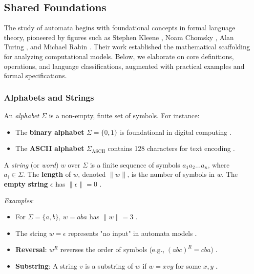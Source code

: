 
\subsection{Shared Foundations}
\label{subsec:shared-foundations} 

The study of automata begins with foundational concepts in formal language theory, pioneered by figures such as Stephen Kleene \cite{kleene1956representation}, Noam Chomsky \cite{chomsky1956three}, Alan Turing \cite{hopcroft2006introduction}, and Michael Rabin \cite{rabin1963probabilistic}. Their work established the mathematical scaffolding for analyzing computational models. Below, we elaborate on core definitions, operations, and language classifications, augmented with practical examples and formal specifications.

\subsubsection{Alphabets and Strings}
An \textit{alphabet} $\Sigma$ is a non-empty, finite set of symbols. For instance:
\begin{itemize}
    \item The \textbf{binary alphabet} $\Sigma = \{0, 1\}$ is foundational in digital computing \cite{hopcroft2006introduction}.
    \item The \textbf{ASCII alphabet} $\Sigma_{\text{ASCII}}$ contains 128 characters for text encoding \cite{cady1986ascii}.
\end{itemize}

A \textit{string} (or \textit{word}) $w$ over $\Sigma$ is a finite sequence of symbols $a_1a_2\ldots a_n$, where $a_i \in \Sigma$. The \textbf{length} of $w$, denoted $\|w\|$, is the number of symbols in $w$. The \textbf{empty string} $\epsilon$ has $\|\epsilon\| = 0$ \cite{hopcroft2006introduction}.  
\newline

\noindent\textit{Examples}:  
\begin{itemize}
    \item For $\Sigma = \{a, b\}$, $w = aba$ has $\|w\| = 3$ \cite{hopcroft2006introduction}.  
    \item The string $w = \epsilon$ represents "no input" in automata models \cite{hopcroft2006introduction}.
\end{itemize}

\begin{itemize}
    \item \textbf{Reversal}: $w^R$ reverses the order of symbols (e.g., $(abc)^R = cba$) \cite{hopcroft2006introduction}.  
    \item \textbf{Substring}: A string $v$ is a substring of $w$ if $w = xvy$ for some $x, y$ \cite{hopcroft2006introduction}.  
\end{itemize}

